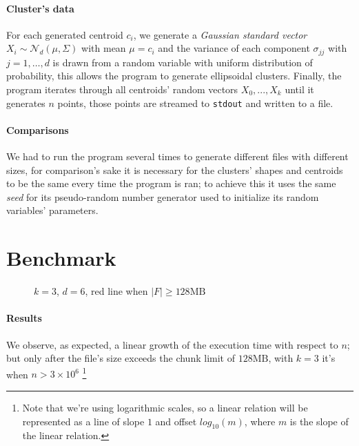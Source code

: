 \documentclass[parskip=full]{report}
\begin{document}
\paragraph{Cluster's data}
For each generated centroid $c_i$, we generate a \emph{Gaussian standard 
vector} $X_i \sim \mathcal{N}_d(\mu, \Sigma)$ with mean $\mu = c_i$ and the 
variance of each component 
$\sigma_{jj}$ with $j = 1, \dots, d$ is 
drawn from a random variable with uniform distribution of probability, this 
allows the program to generate ellipsoidal clusters. Finally, the program 
iterates through all centroids' random vectors $X_0, ..., X_k$ until it 
generates $n$ points, those points are streamed to \texttt{stdout} and written 
to a file.

\paragraph{Comparisons}
We had to run the program several times to generate different files with 
different sizes, for comparison's sake it is necessary for the clusters' shapes 
and centroids to be the same every time the program is ran; to achieve this it 
uses the same  \emph{seed} for its pseudo-random number generator used to 
initialize its random variables' parameters.

\section{Benchmark}

\begin{figure}[H]
	\centering
	\caption{$k=3$, $d=6$, red line when $|F| \ge 128\text{MB}$}
\end{figure}

\paragraph{Results}
We observe, as expected, a linear growth of the execution time with respect to 
$n$; but only after the file's size exceeds the chunk limit of $128\text{MB}$, 
with $k = 3$ it's when $n > 3 \times 10^6$
\footnote{
	Note that we're using 
	logarithmic scales, so a linear relation will 
	be represented as a line of slope $1$ and offset $log_{10}(m)$, where $m$ 
	is the slope of the linear relation.
}
\end{document}
